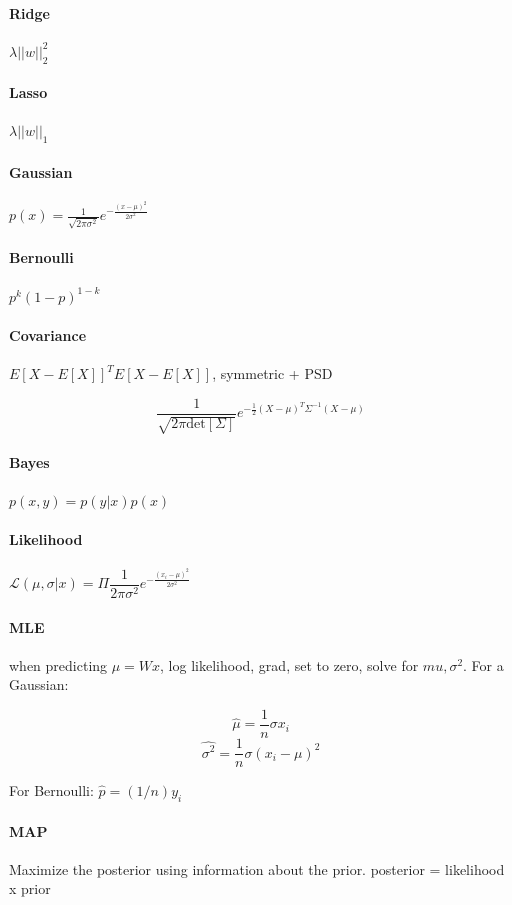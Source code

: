 \documentclass[11pt]{article}
\begin{document}
\paragraph{Ridge} $\lambda ||w||^2_2$

\paragraph{Lasso} $\lambda ||w||_1$

\paragraph{Gaussian} $p(x) = \frac{1}{\sqrt{2 \pi \sigma^2}} e^{- \frac{(x - \mu)^2}{2 \sigma^2}}$

\paragraph{Bernoulli} $p^k(1-p)^{1-k}$

\paragraph{Covariance} $E[X - E[X]]^T E[X - E[X]]$, symmetric + PSD

$$\dfrac{1}{\sqrt{2 \pi \text{det}[\Sigma]}} e^{-\frac{1}{2} (X - \mu)^T \Sigma^{-1} (X - \mu)} $$

\paragraph{Bayes} $p(x, y) = p(y | x)p(x)$

\paragraph{Likelihood} $\mathcal{L}(\mu, \sigma | x) = \Pi \dfrac{1}{2 \pi \sigma^2} e^{-\frac{(x_i - \mu)^2}{2 \sigma^2}}$

\paragraph{MLE} when predicting $\mu = Wx$, log likelihood, grad, set to zero, solve for $mu, \sigma^2$. For a Gaussian:

$$\hat{\mu} = \dfrac{1}{n} \sigma x_i$$
$$\hat{\sigma^2} = \dfrac{1}{n} \sigma (x_i - \mu)^2$$

For Bernoulli: $\hat{p} = (1/n) y_i$

\paragraph{MAP} Maximize the posterior using information about the prior. posterior = likelihood x prior
\end{document}

